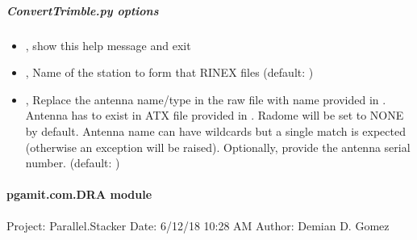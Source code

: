 \documentclass[letterpaper,10pt,english]{sphinxmanual}
\begin{document}
\subparagraph{ConvertTrimble.py options}
\label{\detokenize{pgamit.com:ConvertTrimble.py-options}}\begin{itemize}
\item {} 
\sphinxAtStartPar
{\hyperref[\detokenize{pgamit.com:ConvertTrimble.py--h}]{}}, {\hyperref[\detokenize{pgamit.com:ConvertTrimble.py---help}]{}} \sphinxhyphen{} show this help message and exit

\item {} 
\sphinxAtStartPar
{\hyperref[\detokenize{pgamit.com:ConvertTrimble.py--stnm}]{}} , {\hyperref[\detokenize{pgamit.com:ConvertTrimble.py---station_name}]{}}  \sphinxhyphen{} Name of the station to form that RINEX files (default: )

\item {} 
\sphinxAtStartPar
{\hyperref[\detokenize{pgamit.com:ConvertTrimble.py--ant}]{}} , {\hyperref[\detokenize{pgamit.com:ConvertTrimble.py---antenna_name}]{}}  \sphinxhyphen{} Replace the antenna name/type in the raw file with name provided in . Antenna has to exist in ATX file provided in . Radome will be set to NONE by default. Antenna name can have wildcards but a single match is expected (otherwise an exception will be raised). Optionally, provide the antenna serial number. (default: )

\end{itemize}


\paragraph{pgamit.com.DRA module}
\label{\detokenize{pgamit.com:module-pgamit.com.DRA}}\label{\detokenize{pgamit.com:pgamit-com-dra-module}}
\sphinxAtStartPar
Project: Parallel.Stacker
Date: 6/12/18 10:28 AM
Author: Demian D. Gomez
\end{document}
